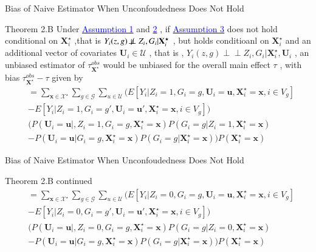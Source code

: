 \documentclass[notes,11pt, aspectratio=169]{beamer}
\begin{document}
\begin{frame}{Bias of Naive Estimator When Unconfoudedness Does Not Hold}
\begin{block}{Theorem 2.B} \label{theorem2.B}
Under \hyperlink{assump1}{\textcolor{blue}{Assumption 1}} and \hyperlink{assump2}{\textcolor{blue}{2}} , if  \hyperlink{assump3}{\textcolor{blue}{Assumption 3}} does not hold conditional on $\mathbf{X}_{i}^\star$ ,that is $Y_i(z,g) \not \! \perp\!\!\!\perp Z_i,G_i|\mathbf{X}_{i}^\star$ , but holds conditioanl on $\mathbf{X}_{i}^\star$ and an additional vector of covariates $\mathbf{U}_i \in \mathcal{U}$ , that is , $Y_i(z,g) \perp\!\!\!\perp Z_i,G_i|\mathbf{X}_{i}^\star , \mathbf{U}_i$ , an unbiased estimator of $\tau_{\mathbf{X}^\star}^{obs}$ would be unbiased for the overall main effect $\tau$ , with bias $\tau_{\mathbf{X}^\star}^{obs} - \tau$ given by
%
\begin{align*}
&=\sum_{\mathbf{x} \in \mathcal{X}^\star}  \sum_{g \in \mathcal{G}} \sum_{u \in \mathcal{U}} \Big( E[Y_i|Z_i=1 , G_i =g , \mathbf{U}_i = \mathbf{u} , \mathbf{X}_{i}^\star = \mathbf{x}, i \in V_g] 
\\ & - E[Y_i|Z_i=1 , G_i =g' , \mathbf{U}_i = \mathbf{u}' , \mathbf{X}_{i}^\star = \mathbf{x}, i \in V_g] \Big)
\\ & \Big( P( \mathbf{U}_i = \mathbf{u} |, Z_i=1 , G_i =g , \mathbf{X}_{i}^\star = \mathbf{x})P( G_i =g | Z_i=1 ,  \mathbf{X}_{i}^\star = \mathbf{x})
\\ & - P( \mathbf{U}_i = \mathbf{u} | G_i =g , \mathbf{X}_{i}^\star = \mathbf{x})P( G_i =g | \mathbf{X}_{i}^\star = \mathbf{x}) \Big) P(\mathbf{X}_{i}^\star = \mathbf{x})
%
\end{align*}
\end{block}
\end{frame}


\begin{frame}{Bias of Naive Estimator When Unconfoudedness Does Not Hold}
\begin{block}{Theorem 2.B continued}
%
\begin{align*}
    & = \sum_{\mathbf{x} \in \mathcal{X}^\star}  \sum_{g \in \mathcal{G}} \sum_{u \in \mathcal{U}} \Big( E[Y_i|Z_i=0 , G_i =g , \mathbf{U}_i = \mathbf{u} , \mathbf{X}_{i}^\star = \mathbf{x}, i \in V_g] 
\\ & - E[Y_i|Z_i= 0 , G_i =g' , \mathbf{U}_i = \mathbf{u}' , \mathbf{X}_{i}^\star = \mathbf{x}, i \in V_g] \Big)
\\ & \Big( P( \mathbf{U}_i = \mathbf{u} |, Z_i=0 , G_i =g , \mathbf{X}_{i}^\star = \mathbf{x})P( G_i =g | Z_i= 0 ,  \mathbf{X}_{i}^\star = \mathbf{x})
\\ & - P( \mathbf{U}_i = \mathbf{u} | G_i =g , \mathbf{X}_{i}^\star = \mathbf{x})P( G_i =g | \mathbf{X}_{i}^\star = \mathbf{x}) \Big) P(\mathbf{X}_{i}^\star = \mathbf{x})
\end{align*}




\end{block}
%
\end{frame}
\end{document}

